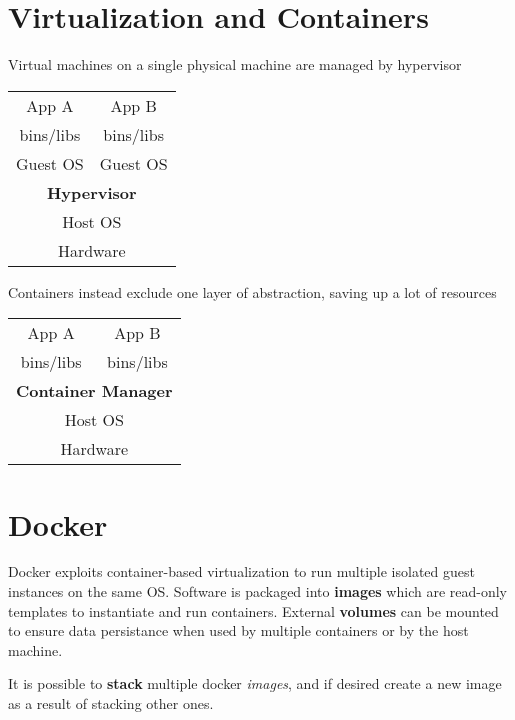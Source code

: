 \section{Virtualization and Containers}
\begin{paracol}{2}
   Virtual machines on a single physical machine are managed by hypervisor
   \begin{table}[!htbp]
      \centering
      \begin{tabular}{|cc|}
         \hline
         App A & App B\\
         bins/libs & bins/libs\\
         Guest OS & Guest OS\\
         \midrule
         \multicolumn{2}{|c|}{\textbf{Hypervisor}}\\
         \hline
         \multicolumn{2}{|c|}{Host OS}\\
         \hline
         \multicolumn{2}{|c|}{Hardware}\\
         \hline
      \end{tabular}
   
   \end{table}

   \vspace{\fill}
   \switchcolumn

   Containers instead exclude one layer of abstraction, saving up a lot of resources
   \vspace{\fill}
   \begin{table}[!htbp]
      \centering
      \begin{tabular}{|cc|}
         \hline
         App A & App B\\
         bins/libs & bins/libs\\
         \midrule
         \multicolumn{2}{|c|}{\textbf{Container Manager}}\\
         \hline
         \multicolumn{2}{|c|}{Host OS}\\
         \hline
         \multicolumn{2}{|c|}{Hardware}\\
         \hline
      \end{tabular}
   \end{table}

   \vspace{\fill}
\end{paracol}

\section{Docker}
Docker exploits container-based virtualization to run multiple isolated guest instances on the same OS.
Software is packaged into \textbf{images} which are read-only templates to instantiate and run containers.
External \textbf{volumes} can be mounted to ensure data persistance when used by multiple containers or by the host machine.

It is possible to \textbf{stack} multiple docker \textit{images},
and if desired create a new image as a result of stacking other ones.
